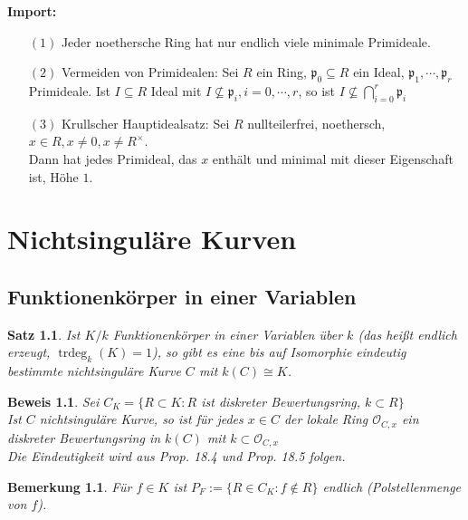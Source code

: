 \documentclass[a4paper,12pt]{report}
\theoremstyle{break}
\newtheorem{Satz}{Satz}
\newtheorem{Bem}[Def]{Bemerkung}
\theoremstyle{nonumberbreak}
\theoremstyle{nonumberplain}
\newtheorem{Bew}{Beweis}
\DeclareMathOperator{\trdeg}{trdeg}
\begin{document}
\textbf{Import:}
\begin{enumerate}
\item[$(1)$] Jeder noethersche Ring hat nur endlich viele minimale Primideale.
\item[$(2)$] Vermeiden von Primidealen: Sei $R$ ein Ring, $\mathfrak p_0\subseteq R$ ein Ideal, $\mathfrak p_1,\cdots,\mathfrak p_r$ Primideale.
  Ist $I\subseteq R$ Ideal mit $I\nsubseteq\mathfrak p_i, i=0,\cdots,r$, so ist $I\nsubseteq\bigcap_{i=0}^r\mathfrak p_i$
\item[$(3)$] Krullscher Hauptidealsatz: Sei $R$ nullteilerfrei, noethersch, $x\in R, x\neq 0, x\neq R^\times$. \\
  Dann hat jedes Primideal, das $x$ enthält und minimal mit dieser Eigenschaft ist, Höhe $1$.
\end{enumerate}



\chapter{Nichtsinguläre Kurven}

\setcounter{section}{17}

\section{Funktionenkörper in einer Variablen}

\begin{Satz}
  \label{satz:6}
  Ist $K/k$ Funktionenkörper in einer Variablen über $k$ (das heißt endlich erzeugt, $\trdeg_k(K)=1$), so gibt es 
  eine bis auf Isomorphie eindeutig bestimmte nichtsinguläre Kurve $C$ mit $k(C)\cong K$.
\end{Satz}

\begin{Bew}
  Sei $C_K=\{R\subset K:R$ ist diskreter Bewertungsring, $k \subset R\}$ \\
  Ist $C$ nichtsinguläre Kurve, so ist für jedes $x\in C$ der lokale Ring $\mathcal O_{C,x}$ ein diskreter Bewertungsring
  in $k(C)$ mit $k\subset\mathcal O_{C,x}$\\
Die Eindeutigkeit wird aus Prop. 18.4 und Prop. 18.5 folgen.
\end{Bew}



\begin{Bem}
\label{bem:18.1}
Für $f\in K$ ist $P_F:=\{R\in C_K:f\notin R\}$ endlich (Polstellenmenge von $f$).
\end{Bem}
\end{document}
